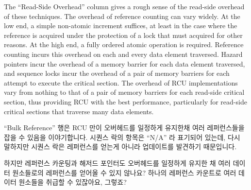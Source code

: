 The ``Read-Side Overhead'' column gives a rough sense of the read-side
overhead of these techniques.
The overhead of reference counting can vary widely.
At the low end, a simple non-atomic increment suffices, at least in the
case where the reference is acquired under the protection of a lock
that must acquired for other reasons.
At the high end, a fully ordered atomic operation is required.
Reference counting incurs this overhead on each and every data element
traversed.
Hazard pointers incur the overhead of a memory barrier for each data element
traversed, and sequence locks incur the overhead of a pair of memory barriers
for each attempt to execute the critical section.
The overhead of RCU implementations vary from nothing to that of a pair of
memory barriers for each read-side critical section, thus providing RCU
with the best performance, particularly for read-side critical sections
that traverse many data elements.
\fi

``Bulk Reference'' 행은 RCU 만이 오버헤드를 일정하게 유지한채 여러 레퍼런스들을
잡을 수 있음을 이야기합니다.
시퀀스 락의 항목은 ``N/A'' 라 표기되어 있는데, 다시 말하지만 시퀀스 락은
레퍼런스를 얻는게 아니라 업데이트를 발견하기 때문입니다.
\iffalse

The ``Bulk Reference'' column indicates that only RCU is capable of acquiring
multiple references with constant overhead.
The entry for sequence locks is ``N/A'' because, again, sequence locks
detect updates rather than acquiring references.
\fi

\QuickQuiz{}
	하지만 레퍼런스 카운팅과 해저드 포인터도 오버헤드를 일정하게 유지한 채
	여러 데이터 원소들로의 레퍼런스를 얻어올 수 있지 않나요?
	하나의 레퍼런스 카운트로 여러 데이터 원소들을 취급할 수 있잖아요,
	그렇죠?
	\iffalse

